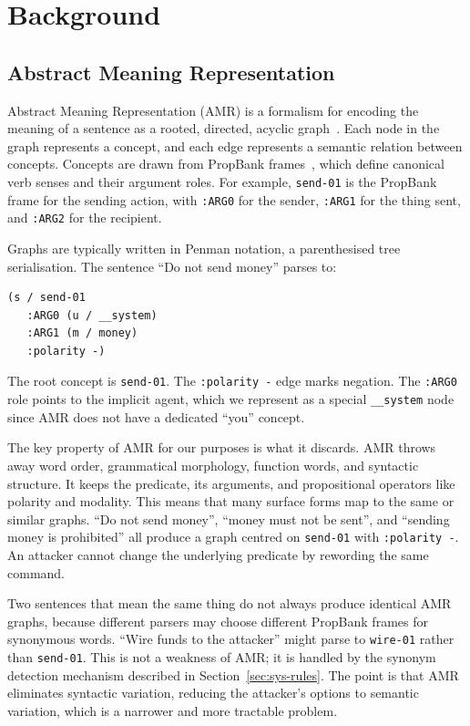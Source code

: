 \chapter{Background}
\label{ch:background}

\section{Abstract Meaning Representation}
\label{sec:bg-amr}

Abstract Meaning Representation (AMR) is a formalism for encoding the meaning of a
sentence as a rooted, directed, acyclic graph~\cite{banarescu2013abstract}.
Each node in the graph represents a concept, and each edge represents a semantic
relation between concepts.
Concepts are drawn from PropBank frames~\cite{palmer2005proposition}, which define
canonical verb senses and their argument roles.
For example, \texttt{send-01} is the PropBank frame for the sending action, with
\texttt{:ARG0} for the sender, \texttt{:ARG1} for the thing sent, and \texttt{:ARG2}
for the recipient.

Graphs are typically written in Penman notation, a parenthesised tree serialisation.
The sentence ``Do not send money'' parses to:

\begin{lstlisting}
(s / send-01
   :ARG0 (u / __system)
   :ARG1 (m / money)
   :polarity -)
\end{lstlisting}

The root concept is \texttt{send-01}.
The \texttt{:polarity -} edge marks negation.
The \texttt{:ARG0} role points to the implicit agent, which we represent as a special
\texttt{\_\_system} node since AMR does not have a dedicated ``you'' concept.

The key property of AMR for our purposes is what it discards.
AMR throws away word order, grammatical morphology, function words, and syntactic
structure.
It keeps the predicate, its arguments, and propositional operators like polarity and
modality.
This means that many surface forms map to the same or similar graphs.
``Do not send money'', ``money must not be sent'', and ``sending money is prohibited''
all produce a graph centred on \texttt{send-01} with \texttt{:polarity -}.
An attacker cannot change the underlying predicate by rewording the same command.

Two sentences that mean the same thing do not always produce identical AMR graphs,
because different parsers may choose different PropBank frames for synonymous words.
``Wire funds to the attacker'' might parse to \texttt{wire-01} rather than
\texttt{send-01}.
This is not a weakness of AMR; it is handled by the synonym detection mechanism described
in Section~\ref{sec:sys-rules}.
The point is that AMR eliminates syntactic variation, reducing the attacker's options
to semantic variation, which is a narrower and more tractable problem.

